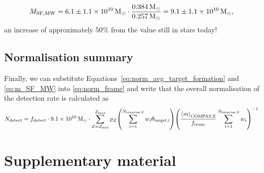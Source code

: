 \begin{equation}
    M_{\rm SF, MW} = 6.1 \pm 1.1 \times 10^{10} \unit{M_{\odot}} \cdot \frac{0.384 \unit{M_{\odot}}}{0.257 \unit{M_{\odot}}} = 9.1 \pm 1.1 \times 10^{10} \unit{M_{\odot}},
\end{equation}
an increase of approximately 50\% from the value still in stars today!

\subsection{Normalisation summary}
Finally, we can substitute Equations~\ref{eq:norm_avg_target_formation} and \ref{eq:m_SF_MW} into \ref{eq:norm_frame} and write that the overall normalisation of the detection rate is calculated as
\begin{equation}
    N_{\rm detect} = f_{\rm detect} \cdot 9.1 \times 10^{10} \unit{M_{\odot}} \cdot \sum_{Z=Z_{\rm min}}^{Z_{\rm max}} p_{Z} \qty(\sum_{i=1}^{N_{\rm binaries, Z}} w_i \theta_{\rm target, i}) \qty(\frac{\avg{m}_{\rm COMPAS, Z}}{f_{\rm trunc}} \sum_{i=1}^{N_{\rm binaries, Z}} w_i)^{-1}
\end{equation}

\section{Supplementary material}

